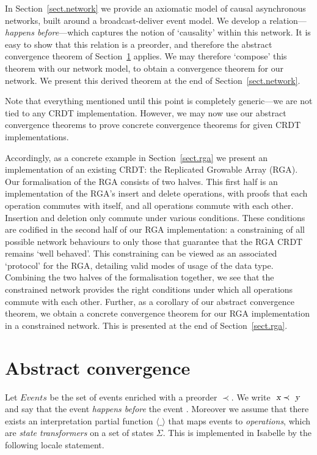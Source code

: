 \documentclass[acmlarge,review,anonymous]{acmart}\settopmatter{printfolios=true}
\begin{document}
In Section~\ref{sect.network} we provide an axiomatic model of causal asynchronous networks, built around a broadcast-deliver event model.
We develop a relation---\emph{happens before}---which captures the notion of `causality' within this network.
It is easy to show that this relation is a preorder, and therefore the abstract convergence theorem of Section~\ref{sect.abstract.convergence} applies.
We may therefore `compose' this theorem with our network model, to obtain a convergence theorem for our network.
We present this derived theorem at the end of Section~\ref{sect.network}.

Note that everything mentioned until this point is completely generic---we are not tied to any CRDT implementation.
However, we may now use our abstract convergence theorems to prove concrete convergence theorems for given CRDT implementations.

Accordingly, as a concrete example in Section~\ref{sect.rga} we present an implementation of an existing CRDT: the Replicated Growable Array (RGA).
Our formalisation of the RGA consists of two halves.
This first half is an implementation of the RGA's insert and delete operations, with proofs that each operation commutes with itself, and all operations commute with each other.
Insertion and deletion only commute under various conditions.
These conditions are codified in the second half of our RGA implementation: a constraining of all possible network behaviours to only those that guarantee that the RGA CRDT remains `well behaved'.
This constraining can be viewed as an associated `protocol' for the RGA, detailing valid modes of usage of the data type.
Combining the two halves of the formalisation together, we see that the constrained network provides the right conditions under which all operations commute with each other.
Further, as a corollary of our abstract convergence theorem, we obtain a concrete convergence theorem for our RGA implementation in a constrained network.
This is presented at the end of Section~\ref{sect.rga}.


\section{Abstract convergence}
\label{sect.abstract.convergence}

Let $\mathit{Events}$ be the set of events enriched with a preorder $\prec$. We
write $\isa{x} \prec \isa{y}$ and say that the event  \emph{happens
before} the event .  Moreover we assume that there exists an
interpretation partial function $\langle\_\rangle$ that maps events to
\emph{operations}, which are \emph{state transformers} on a set of states
$\Sigma$.  This is implemented in Isabelle by the following locale
statement.
\end{document}
